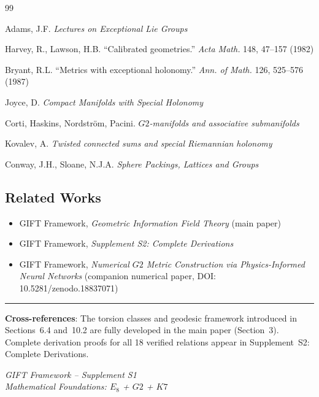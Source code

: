 \documentclass[11pt,a4paper]{article}
\newcommand{\E}{\mathrm{E}}
\newcommand{\Gtwo}{\mathrm{G}_2}
\newcommand{\Kseven}{K_7}
\def\Gtwo{G2}%
\def\Kseven{K7}%
\def\E{E}%
\begin{document}
\begin{thebibliography}{99}

 Adams, J.F. \textit{Lectures on Exceptional Lie Groups}

 Harvey, R., Lawson, H.B. ``Calibrated geometries.'' \textit{Acta Math.} 148, 47--157 (1982)

 Bryant, R.L. ``Metrics with exceptional holonomy.'' \textit{Ann. of Math.} 126, 525--576 (1987)

 Joyce, D. \textit{Compact Manifolds with Special Holonomy}

 Corti, Haskins, Nordstr\"om, Pacini. \textit{$\Gtwo$-manifolds and associative submanifolds}

 Kovalev, A. \textit{Twisted connected sums and special Riemannian holonomy}

 Conway, J.H., Sloane, N.J.A. \textit{Sphere Packings, Lattices and Groups}

\end{thebibliography}

\subsection*{Related Works}
\begin{itemize}
\item GIFT Framework, \textit{Geometric Information Field Theory} (main paper)
\item GIFT Framework, \textit{Supplement S2: Complete Derivations}
\item GIFT Framework, \textit{Numerical $\Gtwo$ Metric Construction via Physics-Informed Neural Networks} (companion numerical paper, DOI: 10.5281/zenodo.18837071)
\end{itemize}

\vfill
\noindent\rule{\textwidth}{0.2pt}

\textbf{Cross-references}: The torsion classes and geodesic framework introduced in Sections~6.4 and~10.2 are fully developed in the main paper (Section~3). Complete derivation proofs for all 18 verified relations appear in Supplement~S2: Complete Derivations.

\vspace{0.5em}
\textit{GIFT Framework -- Supplement S1}\\
\textit{Mathematical Foundations: $\E_8$ + $\Gtwo$ + $\Kseven$}
\end{document}
